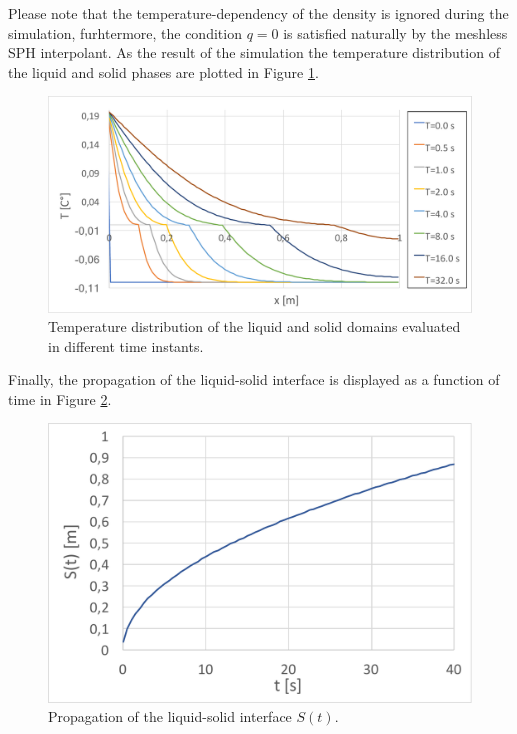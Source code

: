 \documentclass[a4paper,12pt,openany]{book}
\theoremstyle{break}
\begin{document}
Please note that the temperature-dependency of the density is ignored during the simulation, furhtermore, the condition $q=0$ is satisfied naturally by the meshless SPH interpolant. As the result of the simulation the temperature distribution of the liquid and solid phases are plotted in Figure \ref{fig:stefan_problem_result}.
\begin{figure}[H]
  \includegraphics[scale=0.5]{stefan_problem_result.pdf}
  \centering
  \caption{Temperature distribution of the liquid and solid domains evaluated in different time instants.}
  \label{fig:stefan_problem_result}
\end{figure}\vspace*{3pt}

Finally, the propagation of the liquid-solid interface is displayed as a function of time in Figure \ref{fig:stefan_problem_result_s}.
\begin{figure}[H]
  \includegraphics[scale=0.5]{stefan_problem_result_s.pdf}
  \centering
  \caption{Propagation of the liquid-solid interface $S(t)$.}
  \label{fig:stefan_problem_result_s}
\end{figure}\vspace*{3pt}
\end{document}
